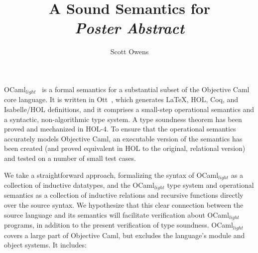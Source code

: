\documentclass{llncs}
\title{A Sound Semantics for \OCL{}\\\emph{\normalsize Poster Abstract}}
\author{Scott Owens}
\institute{University of Cambridge}
\newcommand{\OCL}{OCaml$_\mathit{light}$}
\begin{document}
\maketitle

\OCL{}~\cite{ocl,oclweb} is a formal semantics for a substantial subset of the
Objective Caml core language. It is written in Ott~\cite{ott}, which generates
\LaTeX, HOL, Coq, and Isabelle/HOL definitions, and it comprises a small-step
operational semantics and a syntactic, non-algorithmic type system. A type
soundness theorem has been proved and mechanized in HOL-4. To ensure that the
operational semantics accurately models Objective Caml, an executable version
of the semantics has been created (and proved equivalent in HOL to the
original, relational version) and tested on a number of small test cases.

We take a straightforward approach, formalizing the syntax of \OCL{} as a
collection of inductive datatypes, and the \OCL{} type system and operational
semantics as a collection of inductive relations and recursive functions
directly over the source syntax.  We hypothesize that this clear connection
between the source language and its semantics will facilitate verification
about \OCL{} programs, in addition to the present verification of type
soundness.  \OCL{} covers a large part of Objective Caml, but excludes the
language's module and object systems.  It includes:
\end{document}
